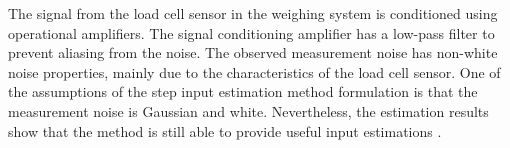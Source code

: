 \begin{comment}
Weighing has been basic for the development of scientific and trade activites. 
The load cell is now a standard transducer for weight determination and also for the improvement of measurement techniques, such as the geometric approach to processing of load cell responses \citep{Kesilmis16}, the design of new conveyor machinery \citep{Yamani18}, and electronic truck scales \citep{Guo18}.

In safety studies, a six axis load cell is devised to quantify accelerations and impact forces exerted on a dummy \citep{Ballo16}.
In alternative energy developments the load cells are useful to measure the forces on the arms of a vertical axis wind turbine \citep{Rossander15}.
An academic study of the load that a structure withstands is conducted with strain gage load cells that confirms the numerical results and facilitates the design of complex shaped structures \citep{Olmi16}.
In sports, the performance of new instrumented crank mechanisms is fostered by the utilization of load cells in the characterization, analysis and validation design stages \citep{Casas16}.

The versatility of the load cells permits the physiological signal monitoring of the the heart and breathing rates \citep{Lee16}, clinical analysis of sleep quality \citep{Zahradka18} and the classification of the movement intensity of people while they are sleeping \citep{Alaziz17}. 
All of these experimental studies have load cells installed on bed setups.


%
An extension of the methodology proposed for the data-driven step input estimation was formulated to estimate the parameters of an affine input that changes at a constant rate,  by signal processing of the sensor transient response.
This type of ramp inputs is observed in the measurement of mass during the transportation of products on conveyor systems, ranging from few grams \citep{Burmen09} to almost hundreds of kilograms \citep{Tasaki07}.
The data-driven affine input estimation method is proposed as an alternative to existing compensation filters, such as 
the time-variant low-pass filters introduced in \citep{Piskorowski08, Pietrzak14}, and
the combination of filters in cascade proposed in \citep{Niedzwiecki16a}.
\end{comment}


The signal from the load cell sensor in the weighing system is conditioned using operational amplifiers.
The signal conditioning amplifier has a low-pass filter to prevent aliasing from the noise.
The observed measurement noise has non-white noise properties, mainly due to the characteristics of the load cell sensor.
One of the assumptions of the step input estimation method formulation is that the measurement noise is Gaussian and white. 
Nevertheless, the estimation results show that the method is still able to provide useful input estimations \citep{QuintanaTIM}.

